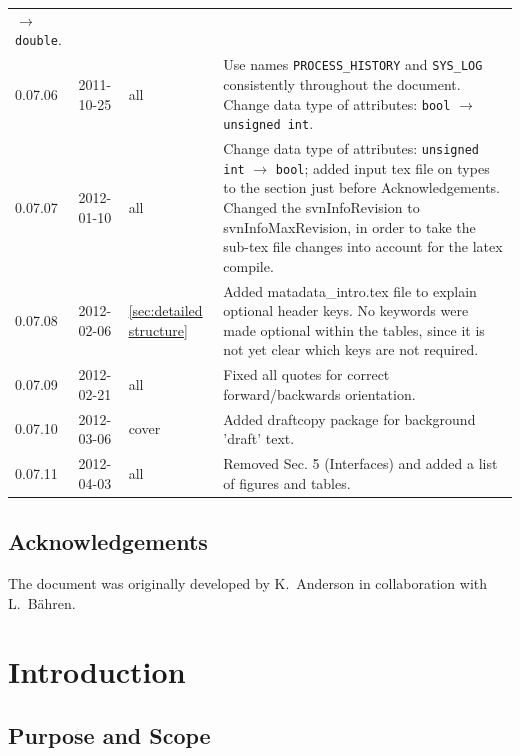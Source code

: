 \documentclass[a4paper,10pt,bibtotoc]{scrartcl}
\begin{document}
\begin{tabular}{lllp{10cm}}
  $\rightarrow$ \verb|double|. \\
  0.07.06 & 2011-10-25 & all &  Use names 
\verb|PROCESS_HISTORY| and \verb|SYS_LOG| consistently throughout the document. 
  Change data type of attributes: \verb|bool| $\rightarrow$ \verb|unsigned int|. \\
  0.07.07 & 2012-01-10 & all &   
  Change data type of attributes: \verb|unsigned int| $\rightarrow$ \verb|bool|;
  added input tex file on types to the section just before Acknowledgements.
  Changed the svnInfoRevision to svnInfoMaxRevision, in order to take the sub-tex file changes into account for the latex compile.\\
  0.07.08 & 2012-02-06 & \ref{sec:detailed structure} & Added matadata\_intro.tex file 
  to explain optional header keys.  No keywords were made optional within the tables, 
  since it is not yet clear which keys are not required.\\
  0.07.09 & 2012-02-21 & all & Fixed all quotes for correct forward/backwards orientation. \\
  0.07.10 & 2012-03-06 & cover & Added draftcopy package for background 'draft' text.\\
  0.07.11 & 2012-04-03 & all & Removed Sec. 5 (Interfaces) and added a list of figures and tables. \\

  \hline
\end{tabular}







\subsection*{Acknowledgements}

The document was originally developed by K.~Anderson in collaboration
with L.~B\"ahren.

\clearpage


\section{Introduction}
\label{sec:introduction}

\subsection{Purpose and Scope}
\label{sec:purpose and scope}
\end{document}
